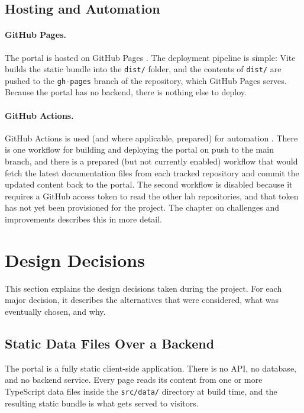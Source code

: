 \subsection{Hosting and Automation}\label{subsec:dev-stack-hosting}

\paragraph{GitHub Pages.}
The portal is hosted on GitHub Pages \cite{githubpages}. The deployment pipeline is simple: Vite builds the static bundle into the \texttt{dist/} folder, and the contents of \texttt{dist/} are pushed to the \texttt{gh-pages} branch of the repository, which GitHub Pages serves. Because the portal has no backend, there is nothing else to deploy.

\paragraph{GitHub Actions.}
GitHub Actions is used (and where applicable, prepared) for automation \cite{githubactions}. There is one workflow for building and deploying the portal on push to the main branch, and there is a prepared (but not currently enabled) workflow that would fetch the latest documentation files from each tracked repository and commit the updated content back to the portal. The second workflow is disabled because it requires a GitHub access token to read the other lab repositories, and that token has not yet been provisioned for the project. The chapter on challenges and improvements describes this in more detail.

\section{Design Decisions}\label{sec:dev-design}

This section explains the design decisions taken during the project. For each major decision, it describes the alternatives that were considered, what was eventually chosen, and why.

\subsection{Static Data Files Over a Backend}\label{subsec:dev-design-static}

The portal is a fully static client-side application. There is no API, no database, and no backend service. Every page reads its content from one or more TypeScript data files inside the \texttt{src/data/} directory at build time, and the resulting static bundle is what gets served to visitors.

